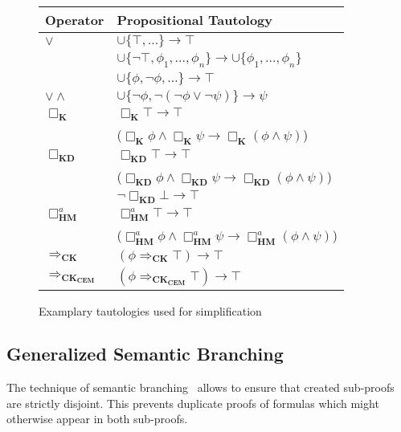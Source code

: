 \documentclass{llncs}
\begin{document}
\begin{footnotesize}
\begin{figure}[!h]
  \begin{center}
\begin{tabular}{| l | l |}
\hline
Operator & Propositional Tautology \\
\hline
$\vee$ & $\cup\{\top,...\}\rightarrow \top$ \\
&  $\cup\{\neg\top,\phi_1,\ldots,\phi_n\}\rightarrow \cup\{\phi_1,\ldots,\phi_n\}$ \\
&  $\cup\{\phi,\neg\phi,\ldots\}\rightarrow \top$ \\
\hline
$\vee\wedge$ & $\cup\{\neg\phi,\neg(\neg\phi\vee\neg\psi)\}\rightarrow\psi$\\
\hline
$\Box_\mathbf{K}$ &  $\Box_\mathbf{K}\top\rightarrow \top$ \\
 & ($\Box_\mathbf{K}\phi\wedge\Box_\mathbf{K}\psi\rightarrow \Box_\mathbf{K}(\phi\wedge\psi)$) \\
\hline
$\Box_\mathbf{KD}$ & $\Box_\mathbf{KD}\top\rightarrow \top$ \\
 & ($\Box_\mathbf{KD}\phi\wedge\Box_\mathbf{KD}\psi\rightarrow \Box_\mathbf{KD}(\phi\wedge\psi)$) \\
 & $\neg\Box_\mathbf{KD}\bot\rightarrow \top$ \\
\hline
$\Box^a_\mathbf{HM}$ &  $\Box^a_\mathbf{HM}\top\rightarrow \top$ \\
 & ($\Box^a_\mathbf{HM}\phi\wedge\Box^a_\mathbf{HM}\psi\rightarrow \Box^a_\mathbf{HM}(\phi\wedge\psi)$) \\
\hline
$\Rightarrow_\mathbf{CK}$ & $(\phi\Rightarrow_\mathbf{CK}\top)\rightarrow\top$ \\
\hline
$\Rightarrow_\mathbf{CK_{CEM}}$ & $(\phi\Rightarrow_\mathbf{CK_{CEM}}\top)\rightarrow\top$ \\
 \hline
 \end{tabular}
  \end{center}
  \caption{Examplary tautologies used for simplification}
  \label{fig:tauts}
\end{figure}
\end{footnotesize}

\subsection{Generalized Semantic Branching}

The technique of semantic branching~\cite{HorrocksPatelSchneider99} allows to ensure that created
sub-proofs are strictly disjoint. This prevents duplicate proofs of formulas
which might otherwise appear in both sub-proofs.
\end{document}
